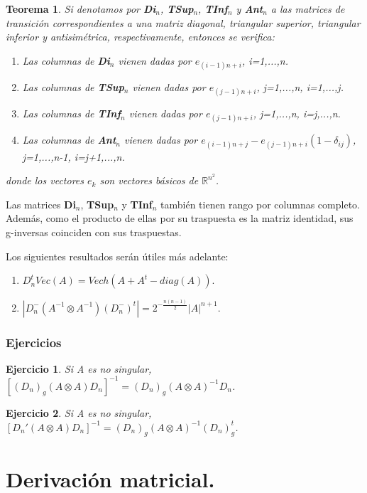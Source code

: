 \documentclass{article}
\theoremstyle{theorem-style}  %
\newtheorem{theorem}{Teorema}[section]  %
\theoremstyle{definition-style}
\theoremstyle{example-style}
\theoremstyle{exercise-style}
\newtheorem{exercise}{Ejercicio}[section]
\begin{document}
\begin{theorem}
	Si denotamos por \textbf{Di$_n$}, \textbf{TSup$_n$}, \textbf{TInf$_n$} y \textbf{Ant$_n$} a las matrices de transición correspondientes a una matriz diagonal, triangular superior, triangular inferior y antisimétrica, respectivamente, entonces se verifica:
	\begin{enumerate}
		\item Las columnas de \textbf{Di$_n$} vienen dadas por $e_{(i-1)n+i}$, i=1,...,n.
		\item Las columnas de \textbf{TSup$_n$} vienen dadas por $e_{(j-1)n+i}$, j=1,...,n, i=1,...,j.
		\item Las columnas de \textbf{TInf$_n$} vienen dadas por $e_{(j-1)n+i}$, j=1,...,n, i=j,...,n.
		\item Las columnas de \textbf{Ant$_n$} vienen dadas por $e_{(i-1)n+j}-e_{(j-1)n+i}(1-\delta_{ij})$, j=1,...,n-1, i=j+1,...,n.
	\end{enumerate}
	donde los vectores $e_k$ son vectores básicos de $\mathbb{R}^{n^2}$.
\end{theorem}

Las matrices \textbf{Di$_n$}, \textbf{TSup$_n$} y \textbf{TInf$_n$} también tienen rango por columnas completo. Además, como el producto de ellas por su traspuesta es la matriz identidad, sus g-inversas coinciden con sus traspuestas.

Los siguientes resultados serán útiles más adelante:
\begin{enumerate}
	\item $D_n^tVec(A) = Vech(A+A^t-diag(A))$.
	\item $|D_n^-(A^{-1}\otimes A^{-1})(D_n^-)^t| = 2^{-\frac{n(n-1)}{2}}|A|^{n+1}$.
\end{enumerate}

\subsubsection{Ejercicios}
	\begin{exercise}
		Si A es no singular, $[(D_n)_g(A\otimes A)D_n]^{-1} = (D_n)_g(A\otimes A)^{-1}D_n$.
	\end{exercise}
	
	\begin{exercise}
		Si A es no singular, $[D_n'(A\otimes A)D_n]^{-1} = (D_n)_g(A\otimes A)^{-1}(D_n)^t_g$.
	\end{exercise}
	
\newpage	
\section{Derivación matricial.}
\end{document}
